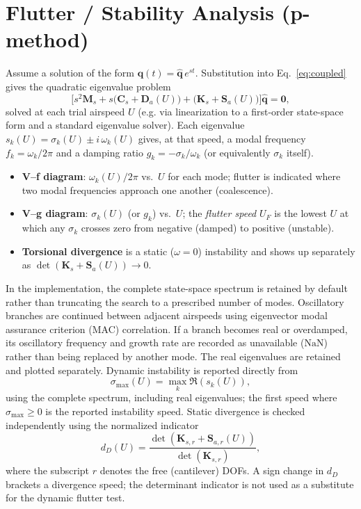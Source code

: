 \documentclass[11pt]{article}
\begin{document}
\section{Flutter / Stability Analysis (p-method)}

Assume a solution of the form $\bm q(t) = \hat{\bm q}\, e^{st}$. Substitution into
Eq.~\eqref{eq:coupled} gives the quadratic eigenvalue problem
\begin{equation}
\Big[s^2 \bm M_s + s\big(\bm C_s + \bm D_a(U)\big) + \big(\bm K_s + \bm S_a(U)\big)\Big]
\hat{\bm q} = \bm 0,
\label{eq:eig}
\end{equation}
solved at each trial airspeed $U$ (e.g. via linearization to a first-order state-space
form and a standard eigenvalue solver). Each eigenvalue $s_k(U) = \sigma_k(U) \pm
i\,\omega_k(U)$ gives, at that speed, a modal frequency $f_k = \omega_k/2\pi$ and a
damping ratio $g_k = -\sigma_k/\omega_k$ (or equivalently $\sigma_k$ itself).

\begin{itemize}
\item \textbf{V--f diagram}: $\omega_k(U)/2\pi$ vs.\ $U$ for each mode; flutter is
indicated where two modal frequencies approach one another (coalescence).
\item \textbf{V--g diagram}: $\sigma_k(U)$ (or $g_k$) vs.\ $U$; the \emph{flutter speed}
$U_F$ is the lowest $U$ at which any $\sigma_k$ crosses zero from negative (damped) to
positive (unstable).
\item \textbf{Torsional divergence} is a static ($\omega=0$) instability and shows up
separately as $\det(\bm K_s + \bm S_a(U)) \to 0$.
\end{itemize}

In the implementation, the complete state-space spectrum is retained by default rather
than truncating the search to a prescribed number of modes. Oscillatory branches are
continued between adjacent airspeeds using eigenvector modal assurance criterion (MAC)
correlation. If a branch becomes real or overdamped, its oscillatory frequency and growth
rate are recorded as unavailable ($\mathrm{NaN}$) rather than being replaced by another
mode. The real eigenvalues are retained and plotted separately. Dynamic instability is
reported directly from
\begin{equation}
 \sigma_{\max}(U)=\max_k \Re(s_k(U)),
\end{equation}
using the complete spectrum, including real eigenvalues; the first speed where
$\sigma_{\max}\geq 0$ is the reported instability speed.
Static divergence is checked independently using the normalized indicator
\begin{equation}
 d_D(U) =
 \frac{\det(\bm K_{s,r}+\bm S_{a,r}(U))}
 {\det(\bm K_{s,r})},
\end{equation}
where the subscript $r$ denotes the free (cantilever) DOFs. A sign change in $d_D$
brackets a divergence speed; the determinant indicator is not used as a substitute for
the dynamic flutter test.
\end{document}
